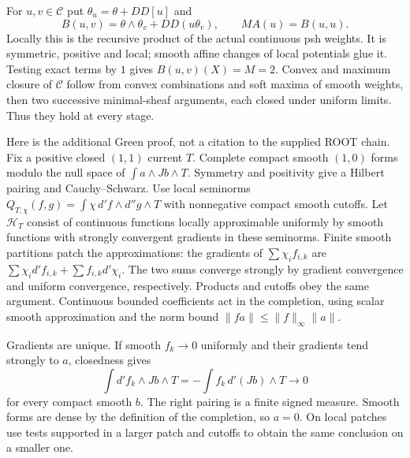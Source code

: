\documentclass[11pt]{article}
\begin{document}
For $u,v\in\mathcal C$ put $\theta_u=\theta+DD[u]$ and
\[
 B(u,v)=\theta\wedge\theta_v+DD(u\theta_v),\qquad MA(u)=B(u,u).
\]
Locally this is the recursive product of the actual continuous psh weights. It is symmetric, positive and local; smooth affine changes of local potentials glue it. Testing exact terms by $1$ gives $B(u,v)(X)=M=2$. Convex and maximum closure of $\mathcal C$ follow from convex combinations and soft maxima of smooth weights, then two successive minimal-sheaf arguments, each closed under uniform limits. Thus they hold at every stage.

Here is the additional Green proof, not a citation to the supplied ROOT chain. Fix a positive closed $(1,1)$ current $T$. Complete compact smooth $(1,0)$ forms modulo the null space of $\int a\wedge Jb\wedge T$. Symmetry and positivity give a Hilbert pairing and Cauchy--Schwarz. Use local seminorms $Q_{T,\chi}(f,g)=\int\chi\,d'f\wedge d''g\wedge T$ with nonnegative compact smooth cutoffs. Let $\mathscr H_T$ consist of continuous functions locally approximable uniformly by smooth functions with strongly convergent gradients in these seminorms. Finite smooth partitions patch the approximations: the gradients of $\sum\chi_i f_{i,k}$ are $\sum\chi_i d'f_{i,k}+\sum f_{i,k}d'\chi_i$. The two sums converge strongly by gradient convergence and uniform convergence, respectively. Products and cutoffs obey the same argument. Continuous bounded coefficients act in the completion, using scalar smooth approximation and the norm bound $\|fa\|\le\|f\|_\infty\|a\|$.

Gradients are unique. If smooth $f_k\to0$ uniformly and their gradients tend strongly to $a$, closedness gives
\[
 \int d'f_k\wedge Jb\wedge T=-\int f_k\,d'(Jb)\wedge T\longrightarrow0
\]
for every compact smooth $b$. The right pairing is a finite signed measure. Smooth forms are dense by the definition of the completion, so $a=0$. On local patches use tests supported in a larger patch and cutoffs to obtain the same conclusion on a smaller one.
\end{document}
